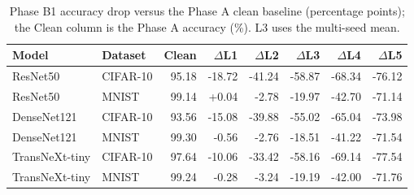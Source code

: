 \begin{table}[htbp]
\centering
\caption{Phase B1 accuracy drop versus the Phase A clean baseline (percentage points); the Clean column is the Phase A accuracy (\%). L3 uses the multi-seed mean.}
\label{tab:b1_delta}
\setlength{\tabcolsep}{4pt}
\renewcommand{\arraystretch}{1.1}
\begin{tabular}{llrrrrrr}
\toprule
Model & Dataset & Clean & $\Delta$L1 & $\Delta$L2 & $\Delta$L3 & $\Delta$L4 & $\Delta$L5 \\
\midrule
ResNet50 & CIFAR-10 & 95.18 & -18.72 & -41.24 & -58.87 & -68.34 & -76.12 \\
ResNet50 & MNIST & 99.14 & +0.04 & -2.78 & -19.97 & -42.70 & -71.14 \\
DenseNet121 & CIFAR-10 & 93.56 & -15.08 & -39.88 & -55.02 & -65.04 & -73.98 \\
DenseNet121 & MNIST & 99.30 & -0.56 & -2.76 & -18.51 & -41.22 & -71.54 \\
TransNeXt-tiny & CIFAR-10 & 97.64 & -10.06 & -33.42 & -58.16 & -69.14 & -77.54 \\
TransNeXt-tiny & MNIST & 99.24 & -0.28 & -3.24 & -19.19 & -42.00 & -71.76 \\
\bottomrule
\end{tabular}
\end{table}
